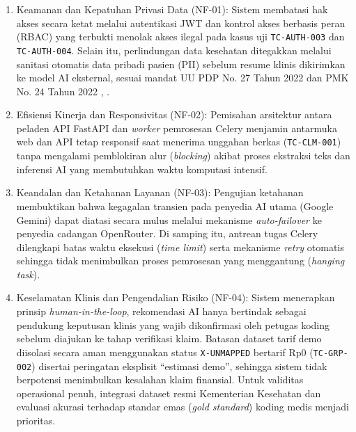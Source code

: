 \begin{enumerate}[leftmargin=1.5em, itemsep=1pt, parsep=0pt]
  \item Keamanan dan Kepatuhan Privasi Data (NF-01): Sistem membatasi hak akses secara ketat melalui autentikasi JWT dan kontrol akses berbasis peran (RBAC) yang terbukti menolak akses ilegal pada kasus uji \texttt{TC-AUTH-003} dan \texttt{TC-AUTH-004}. Selain itu, perlindungan data kesehatan ditegakkan melalui sanitasi otomatis data pribadi pasien (PII) sebelum resume klinis dikirimkan ke model AI eksternal, sesuai mandat UU PDP No. 27 Tahun 2022 dan PMK No. 24 Tahun 2022 \cite{21}, \cite{11}.
  \item Efisiensi Kinerja dan Responsivitas (NF-02): Pemisahan arsitektur antara peladen API FastAPI dan \textit{worker} pemrosesan Celery menjamin antarmuka web dan API tetap responsif saat menerima unggahan berkas (\texttt{TC-CLM-001}) tanpa mengalami pemblokiran alur (\textit{blocking}) akibat proses ekstraksi teks dan inferensi AI yang membutuhkan waktu komputasi intensif.
  \item Keandalan dan Ketahanan Layanan (NF-03): Pengujian ketahanan membuktikan bahwa kegagalan transien pada penyedia AI utama (Google Gemini) dapat diatasi secara mulus melalui mekanisme \textit{auto-failover} ke penyedia cadangan OpenRouter. Di samping itu, antrean tugas Celery dilengkapi batas waktu eksekusi (\textit{time limit}) serta mekanisme \textit{retry} otomatis sehingga tidak menimbulkan proses pemrosesan yang menggantung (\textit{hanging task}).
  \item Keselamatan Klinis dan Pengendalian Risiko (NF-04): Sistem menerapkan prinsip \textit{human-in-the-loop}, rekomendasi AI hanya bertindak sebagai pendukung keputusan klinis yang wajib dikonfirmasi oleh petugas koding sebelum diajukan ke tahap verifikasi klaim. Batasan dataset tarif demo diisolasi secara aman menggunakan status \texttt{X-UNMAPPED} bertarif Rp0 (\texttt{TC-GRP-002}) disertai peringatan eksplisit ``estimasi demo'', sehingga sistem tidak berpotensi menimbulkan kesalahan klaim finansial. Untuk validitas operasional penuh, integrasi dataset resmi Kementerian Kesehatan dan evaluasi akurasi terhadap standar emas (\textit{gold standard}) koding medis menjadi prioritas.
\end{enumerate}
